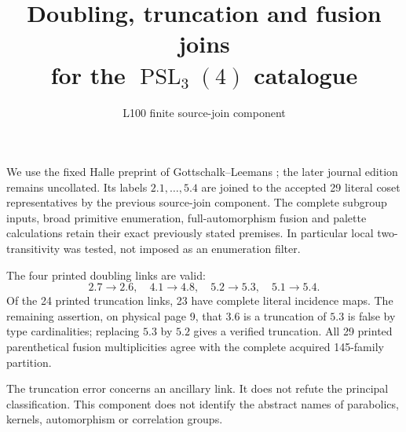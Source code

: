 \documentclass[11pt]{article}
\title{Doubling, truncation and fusion joins\\for the $\operatorname{PSL}_3(4)$ catalogue}
\author{L100 finite source-join component}\date{}
\begin{document}
\maketitle
We use the fixed Halle preprint of Gottschalk--Leemans \cite{GL}; the
later journal edition remains uncollated. Its labels $2.1,\ldots,5.4$
are joined to the accepted 29 literal coset representatives by the
previous source-join component. The complete subgroup inputs, broad
primitive enumeration, full-automorphism fusion and palette calculations
retain their exact previously stated premises. In particular local
two-transitivity was tested, not imposed as an enumeration filter.

\begin{theorem}
The four printed doubling links are valid:
\[
2.7\longrightarrow2.6,\quad4.1\longrightarrow4.8,\quad
5.2\longrightarrow5.3,\quad5.1\longrightarrow5.4.
\]
Of the 24 printed truncation links, 23 have complete literal incidence
maps. The remaining assertion, on physical page 9, that $3.6$ is a
truncation of $5.3$ is false by type cardinalities; replacing $5.3$ by
$5.2$ gives a verified truncation. All 29 printed parenthetical fusion
multiplicities agree with the complete acquired 145-family partition.
\end{theorem}
The truncation error concerns an ancillary link. It does not refute
the principal classification. This component does not identify the
abstract names of parabolics, kernels, automorphism or correlation groups.
\end{document}
